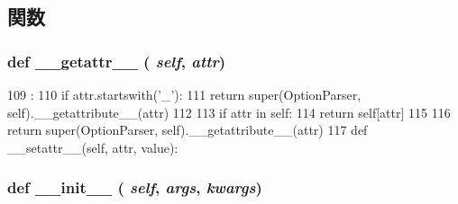 \subsection{関数}
\hypertarget{classm5_1_1options_1_1OptionParser_a0a990b3ec3889d40889daca9ee5e4695}{
\subsubsection[{\_\-\_\-getattr\_\-\_\-}]{\setlength{\rightskip}{0pt plus 5cm}def \_\-\_\-getattr\_\-\_\- ( {\em self}, \/   {\em attr})}}
\label{classm5_1_1options_1_1OptionParser_a0a990b3ec3889d40889daca9ee5e4695}



\begin{DoxyCode}
109                                :
110         if attr.startswith('_'):
111             return super(OptionParser, self).__getattribute__(attr)
112 
113         if attr in self:
114             return self[attr]
115 
116         return super(OptionParser, self).__getattribute__(attr)
117 
    def __setattr__(self, attr, value):
\end{DoxyCode}
\hypertarget{classm5_1_1options_1_1OptionParser_ac775ee34451fdfa742b318538164070e}{
\subsubsection[{\_\-\_\-init\_\-\_\-}]{\setlength{\rightskip}{0pt plus 5cm}def \_\-\_\-init\_\-\_\- ( {\em self}, \/   {\em args}, \/   {\em kwargs})}}
\label{classm5_1_1options_1_1OptionParser_ac775ee34451fdfa742b318538164070e}



